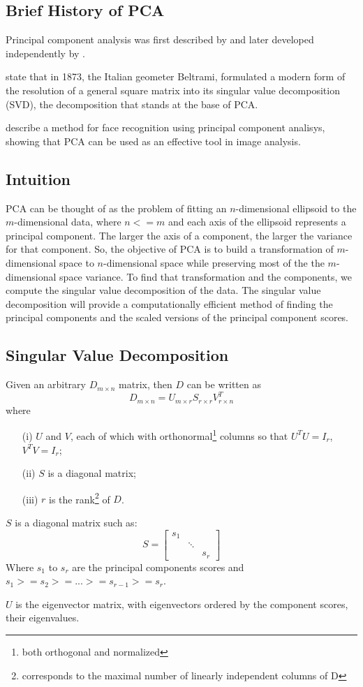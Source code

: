 \documentclass{article} %
\begin{document}
\subsection{Brief History of PCA}
Principal component analysis was first described by \citet{pearson1901principal} and later developed independently by \citet{hotelling1933analysis} \citep{jolliffe1986principal}.\par
\citet{preisendorfer1988principal} state that in 1873, the Italian geometer Beltrami, formulated a modern form of the resolution of a general square matrix into its singular value decomposition (SVD), the decomposition that stands at the base of PCA.\par
\citet{craw1992face} describe a method for face recognition using principal component analisys, showing that PCA can be used as an effective tool in image analysis.
\subsection{Intuition}
PCA can be thought of as the problem of fitting an $n$-dimensional ellipsoid to the $m$-dimensional data, where $n<=m$ and each axis of the ellipsoid represents a principal component. The larger the axis of a component, the larger the variance for that component. So, the objective of PCA is to build a transformation of $m$-dimensional space to $n$-dimensional space while preserving most of the the $m$-dimensional space variance. To find that transformation and the components, we compute the singular value decomposition of the data. The singular value decomposition will provide a computationally efficient method of finding the principal components and the scaled versions of the principal component scores.
\subsection{Singular Value Decomposition}
Given an arbitrary $D_{m\times n}$ matrix, then $D$ can be written as
\begin{equation} \label{eq1}
D_{m\times n}=U_{m\times r}S_{r\times r}V_{r\times n}^T
\end{equation}
where
\begin{enumerate}
\item[(i)] $U$ and $V$, each of which with orthonormal\footnote{both orthogonal and normalized} columns so that $U^TU=I_{r}$, $V^TV=I_{r}$;
\item[(ii)] $S$ is a diagonal matrix;
\item[(iii)] $r$ is the rank\footnote{corresponds to the maximal number of linearly independent columns of D} of $D$.
\end{enumerate}
$S$ is a diagonal matrix such as:
\[
  S =
  \begin{bmatrix}
    s_{1} & & \\
    & \ddots & \\
    & & s_{r}
  \end{bmatrix}
\]
Where $s_{1}$ to $s_{r}$ are the principal components scores and $s_{1} >= s_{2} >= ... >= s_{r-1} >= s_{r}$.\par
$U$ is the eigenvector matrix, with eigenvectors ordered by the component scores, their eigenvalues.
\end{document}
